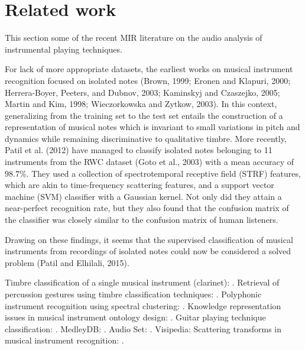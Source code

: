 \documentclass{article}
\begin{document}
\section{Related work}
This section some of the recent MIR literature on the audio analysis of instrumental playing techniques.


For lack of more appropriate datasets, the earliest works on musical instrument recognition focused on isolated notes (Brown, 1999; Eronen and Klapuri, 2000; Herrera-Boyer, Peeters, and Dubnov, 2003; Kaminskyj and Czaszejko, 2005; Martin and Kim, 1998; Wieczorkowska
and Zytkow, 2003).
In this context, generalizing from the training set to the test set entails the construction of a representation of musical notes which is invariant to small variations in pitch and dynamics while remaining discriminative to qualitative timbre.
More recently, Patil et al. (2012) have managed to classify isolated notes belonging to 11 instruments from the RWC dataset (Goto et al., 2003) with a mean accuracy of $98.7\%$.
They used a collection of spectrotemporal receptive field (STRF) features, which are akin to time-frequency scattering features, and a support vector machine (SVM) classifier with a Gaussian kernel.
Not only did they attain a near-perfect recognition rate, but they also found that the confusion matrix of the classifier was closely similar to the confusion matrix of human listeners.

Drawing on these findings, it seems that the supervised classification
of musical instruments from recordings of isolated notes could
now be considered a solved problem (Patil and Elhilali, 2015).

Timbre classification of a single musical instrument (clarinet): \cite{loureiro2004ismir}.
Retrieval of percussion gestures using timbre classification techniques: \cite{tindale2004ismir}.
Polyphonic instrument recognition using spectral clustering: \cite{martins2007ismir}.
Knowledge representation issues in musical instrument ontology design: \cite{kolozali2011ismir}.
Guitar playing technique classification: \cite{su2014ismir}.
MedleyDB: \cite{bittner2014ismir}.
Audio Set: \cite{gemmeke2017icassp}.
Visipedia: \cite{belongie2015pattern}
Scattering transforms in musical instrument recognition: \cite{tjoa2010ismir,lostanlen2017phd}.


\end{document}
